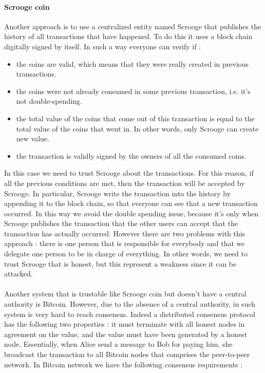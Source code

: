 \paragraph{Scrooge coin} Another approach is to use a centralized entity named Scrooge that publishes the history of all transactions that have happened. To do this it uses a block chain digitally signed by itself. In such a way everyone can verify if :
\begin{itemize}
\item the coins are valid, which means that they were really created in previous transactions.
\item the coins were not already consumed in some previous transaction, i.e. it's not double-spending.
\item the total value of the coins that come out of this transaction is equal to the total value of the coins that went in. In other words, only Scrooge can create new value.
\item the transaction is validly signed by the owners of all the consumed coins.
\end{itemize}
In this case we need to trust Scrooge about the transactions. For this reason, if all the previous conditions are met, then the transaction will be accepted by Scrooge. In particular, Scrooge write the transaction into the history by appending it to the block chain, so that everyone can see that a new transaction occurred. In this way we avoid the double spending issue, because it's only when Scrooge publishes the transaction that the other users can accept that the transaction has actually occurred. However there are two problems with this approach : there is one person that is responsible for everybody and that we delegate one person to be in charge of everything. In other words, we need to trust Scrooge that is honest, but this represent a weakness since it can be attacked.\\\\Another system that is trustable like Scrooge coin but doesn't have a central authority is Bitcoin. However, due to the absence of a central authority, in such system is very hard to reach consensus. Indeed a distributed consensus protocol has the following two properties : it must terminate with all honest nodes in agreement on the value, and the value must have been generated by a honest node. Essentially, when Alice send a message to Bob for paying him, she broadcast the transaction to all Bitcoin nodes that comprises the peer-to-peer network. In Bitcoin network we have the following consensus requirements :
